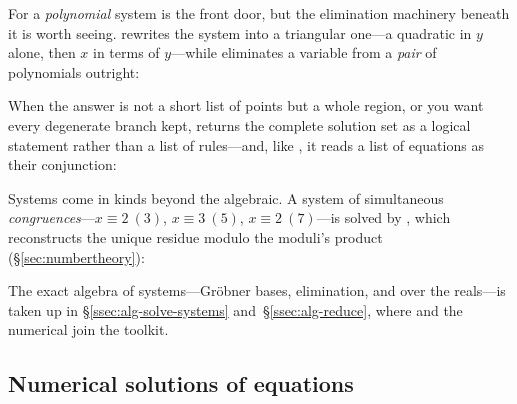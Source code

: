 For a \emph{polynomial} system  is the front
door, but the elimination machinery beneath it is worth seeing.  rewrites
the system into a triangular one---a quadratic in $y$ alone, then $x$ in terms of
$y$---while  eliminates a variable from a \emph{pair} of polynomials outright:

\begin{codepairs}
\end{codepairs}

When the answer is not a short list of points but a whole region, or you want every
degenerate branch kept,  returns the complete solution set as a logical statement
rather than a list of rules---and, like , it reads a list of equations as their
conjunction:

\begin{codepairs}
\end{codepairs}

Systems come in kinds beyond the algebraic. A system of simultaneous
\emph{congruences}---$x\equiv2\ (3)$, $x\equiv3\ (5)$,
$x\equiv2\ (7)$---is solved by , which reconstructs the unique residue
modulo the moduli's product (\S\ref{sec:numbertheory}):

\begin{codepairs}
\pair{03-introduction/solve-systems/7}{The unique residue $23$ in $[0,105)$.}
\end{codepairs}

The exact algebra of systems---Gr\"obner bases, elimination, and  over the
reals---is taken up in \S\ref{ssec:alg-solve-systems} and~\S\ref{ssec:alg-reduce}, where
 and the numerical  join the toolkit.

\subsection{Numerical solutions of equations}

